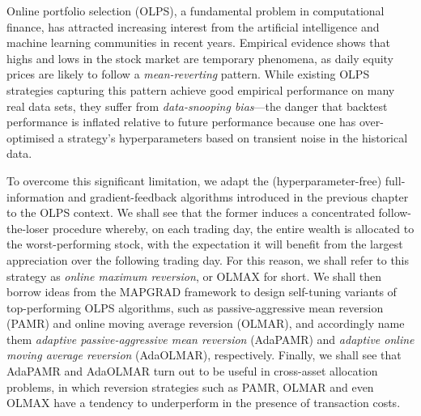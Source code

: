 Online portfolio selection (OLPS), a fundamental problem in computational finance, has attracted increasing interest from the artificial intelligence and machine learning communities in recent years. Empirical evidence shows that highs and lows in the stock market are temporary phenomena, as daily equity prices are likely to follow a \emph{mean-reverting} pattern. While existing OLPS strategies capturing this pattern achieve good empirical performance on many real data sets, they suffer from \emph{data-snooping bias}---the danger that backtest performance is inflated relative to future performance because one has over-optimised a strategy's hyperparameters based on transient noise in the historical data.

\begin{mccorrection}
To overcome this significant limitation, we adapt the (hyperparameter-free) full-information and gradient-feedback algorithms introduced in the previous chapter to the OLPS context. We shall see that the former induces a concentrated follow-the-loser procedure whereby, on each trading day, the entire wealth is allocated to the worst-performing stock, with the expectation it will benefit from the largest appreciation over the following trading day. For this reason, we shall refer to this strategy as \emph{online maximum reversion}, or OLMAX for short. We shall then borrow ideas from the MAPGRAD framework to design self-tuning variants of top-performing OLPS algorithms, such as passive-aggressive mean reversion (PAMR) and online moving average reversion (OLMAR), and accordingly name them \emph{adaptive passive-aggressive mean reversion} (AdaPAMR) and \emph{adaptive online moving average reversion} (AdaOLMAR), respectively. Finally, we shall see that AdaPAMR and AdaOLMAR turn out to be useful in cross-asset allocation problems, in which reversion strategies such as PAMR, OLMAR and even OLMAX have a tendency to underperform in the presence of transaction costs.
\end{mccorrection}

